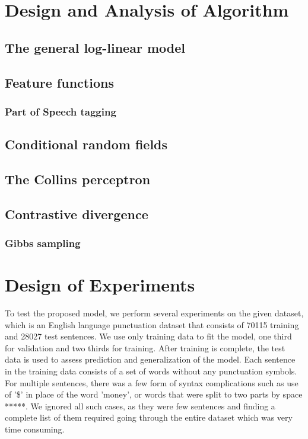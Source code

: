 \documentclass[twoside,12pt]{article}
\begin{document}
\section{Design and Analysis of Algorithm}
\subsection{The general log-linear model}
\subsection{Feature functions}
\subsubsection{Part of Speech tagging}
\subsection{Conditional random fields}
\subsection{The Collins perceptron}
\subsection{Contrastive divergence}
\subsubsection{Gibbs sampling}
\section{Design of Experiments}

To test the proposed model, we perform several experiments on the given dataset, which is an English language punctuation dataset that consists of 70115 training and 28027 test sentences. We use only training data to fit the model,  one third for validation and two thirds for training.	 After training is complete, the test data is used to assess prediction and generalization of the model. Each sentence in the training data consists of a set of words without any punctuation symbols. For multiple sentences, there was a few form of syntax complications such as use of '\$' in place of the word 'money', or words that were split to two parts by space *****. We ignored all such cases, as they were few sentences and finding a complete list of them required going through the entire dataset which was very time consuming.\\
\end{document}
